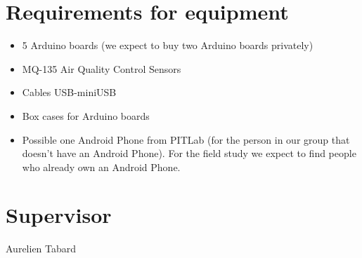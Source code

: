 \documentclass{ubicomp2011}
\begin{document}
\section{Requirements for equipment}
\begin{itemize}
	\item 5 Arduino boards (we expect to buy two Arduino boards privately)
	\item MQ-135 Air Quality Control Sensors
	\item Cables USB-miniUSB
	\item Box cases for Arduino boards
	\item Possible one Android Phone  from PITLab (for the person in our group that doesn’t have an Android Phone). For the field study we expect to find people who already own an Android Phone. 
\end{itemize}

\section{Supervisor}
Aurelien Tabard 



\end{document}
